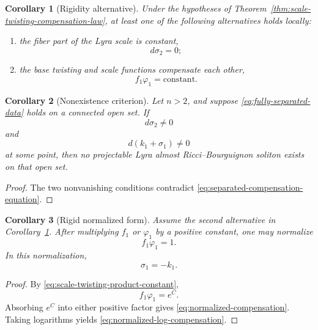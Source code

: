 \documentclass[a4paper,11pt]{article}
\theoremstyle{plain}
\newtheorem{corollary} {Corollary}[section]
\numberwithin{equation}{section}
\begin{document}
\begin{corollary}[Rigidity alternative]
	\label{cor:scale-twisting-rigidity-alternative}
	Under the hypotheses of
	Theorem~\ref{thm:scale-twisting-compensation-law}, at least one
	of the following alternatives holds locally:
	\begin{enumerate}
		\item the fiber part of the Lyra scale is constant,
		\[
		d\sigma_{2}=0;
		\]
		\item the base twisting and scale functions compensate each
		other,
		\[
		f_{1}\varphi_{1}=\mathrm{constant}.
		\]
	\end{enumerate}
\end{corollary}

\begin{corollary}[Nonexistence criterion]
	\label{cor:separated-nonexistence}
	Let \(n>2\), and suppose
	\eqref{eq:fully-separated-data} holds on a connected open set.
	If
	\[
	d\sigma_{2}\neq0
	\]
	and
	\[
	d(k_{1}+\sigma_{1})\neq0
	\]
	at some point, then no projectable Lyra almost
	Ricci--Bourguignon soliton exists on that open set.
\end{corollary}

\begin{proof}
	The two nonvanishing conditions contradict
	\eqref{eq:separated-compensation-equation}.
\end{proof}

\begin{corollary}[Rigid normalized form]
	\label{cor:rigid-normalized-form}
	Assume the second alternative in
	Corollary~\ref{cor:scale-twisting-rigidity-alternative}. After
	multiplying \(f_{1}\) or \(\varphi_{1}\) by a positive constant,
	one may normalize
	\begin{equation}
		f_{1}\varphi_{1}=1.
		\label{eq:normalized-compensation}
	\end{equation}
	In this normalization,
	\begin{equation}
		\sigma_{1}=-k_{1}.
		\label{eq:normalized-log-compensation}
	\end{equation}
\end{corollary}

\begin{proof}
	By \eqref{eq:scale-twisting-product-constant},
	\[
	f_{1}\varphi_{1}=e^{C}.
	\]
	Absorbing \(e^{C}\) into either positive factor gives
	\eqref{eq:normalized-compensation}. Taking logarithms yields
	\eqref{eq:normalized-log-compensation}.
\end{proof}
\end{document}
